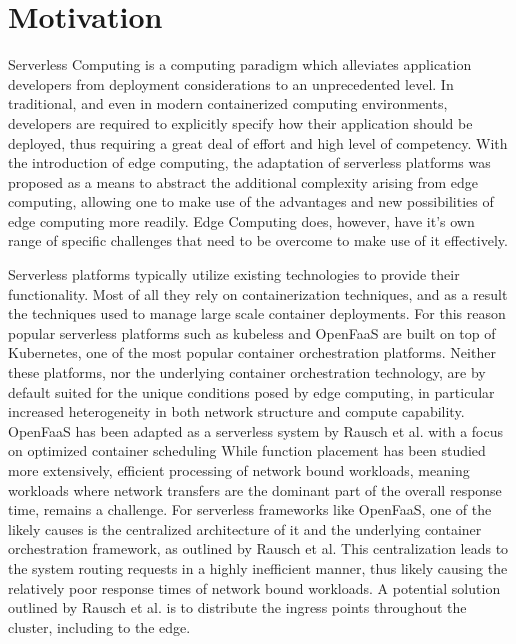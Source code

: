 \section{Motivation}
Serverless Computing is a computing paradigm which alleviates application developers from deployment considerations to an unprecedented level. %
In traditional, and even in modern containerized computing environments, developers are required to explicitly specify how their application should be deployed, thus requiring a great deal of effort and high level of competency. %
With the introduction of edge computing, the adaptation of serverless platforms was proposed as a means to abstract the additional complexity arising from edge computing, allowing one to make use of the advantages and new possibilities of edge computing more readily. %
Edge Computing does, however, have it's own range of specific challenges that need to be overcome to make use of it effectively. %

Serverless platforms typically utilize existing technologies to provide their functionality. Most of all they rely on containerization techniques, and as a result the techniques used to manage large scale container deployments.
For this reason popular serverless platforms such as kubeless and OpenFaaS are built on top of Kubernetes, one of the most popular container orchestration platforms.
Neither these platforms, nor the underlying container orchestration technology, are by default suited for the unique conditions posed by edge computing, in particular increased heterogeneity in both network structure and compute capability.
OpenFaaS has been adapted as a serverless system by Rausch et al. with a focus on optimized container scheduling %
While function placement has been studied more extensively, efficient processing of network bound workloads, meaning workloads where network transfers are the dominant part of the overall response time, remains a challenge. For serverless frameworks like OpenFaaS, one of the likely causes is the centralized architecture of it and the underlying container orchestration framework, as outlined by Rausch et al. %
This centralization leads to the system routing requests in a highly inefficient manner, thus likely causing the relatively poor response times of network bound workloads. A potential solution outlined by Rausch et al. is to distribute the ingress points throughout the cluster, including to the edge. %



